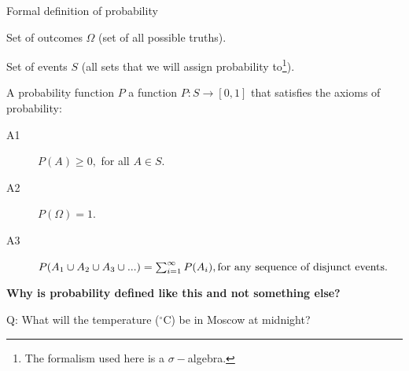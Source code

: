 \begin{frame}{Formal definition of probability}

\begin{scriptsize}


\bigskip

Set of outcomes \textbf{$\Omega$} (set of all possible truths).

\smallskip

Set of events \textbf{$S$}  (all sets that we will assign probability to\footnote{The formalism used here is a $\sigma-$algebra.}).

\bigskip

A probability function $P$ a function $P:S \rightarrow [0,1]$ that satisfies the axioms of probability:

\begin{description}
\item[A1] $P(A) \geq 0, $ for all $A \in S$.
\item[A2] $P(\Omega) = 1.$
\item[A3] $P(A_1 \cup A_2 \cup A_3 \cup ...) = \sum_{i=1}^\infty P(A_i), \break \text{for any sequence of disjunct events}.$
\end{description}

\smallskip
\textbf{Why is probability defined like this and not something else?}
\end{scriptsize}

\end{frame}


\begin{frame}{}
\centering
\bigskip
\bigskip
\smallskip
\begin{LARGE}
{\color{red} Q:} What will the temperature ($^\circ$C) be in Moscow at midnight?
\end{LARGE}
\end{frame}

